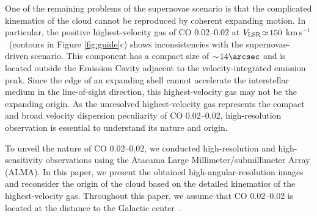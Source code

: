\documentclass[twocolumn]{aastex631}
\newcommand\kms{\hbox{km$\,$s$^{-1}$}}
\begin{document}
One of the remaining problems of the supernovae scenario is that the complicated kinematics of the cloud cannot be reproduced by coherent expanding motion. In particular, the positive highest-velocity gas of CO 0.02--0.02 at $V_{\rm LSR}\!\simeq\! 150$ \kms\ (contours in Figure \ref{fig:guide}c) shows inconsistencies with the supernovae-driven scenario. This component has a compact size of $\sim\! 14\arcsec$ and is located outside the Emission Cavity adjacent to the velocity-integrated emission peak. Since the edge of an expanding shell cannot accelerate the interstellar medium in the line-of-sight direction, this highest-velocity gas may not be the expanding origin. As the unresolved highest-velocity gas represents the compact and broad velocity dispersion peculiarity of CO 0.02--0.02, high-resolution observation is essential to understand its nature and origin.

To unveil the nature of CO 0.02--0.02, we conducted high-resolution and high-sensitivity observations using the Atacama Large Millimeter/submillimeter Array (ALMA). In this paper, we present the obtained high-angular-resolution images and reconsider the origin of the cloud based on the detailed kinematics of the highest-velocity gas. Throughout this paper, we assume that CO 0.02--0.02 is located at the distance to the Galactic center~\citep[$8.277$ {\rm kpc};][]{Gravity22}.
\end{document}
